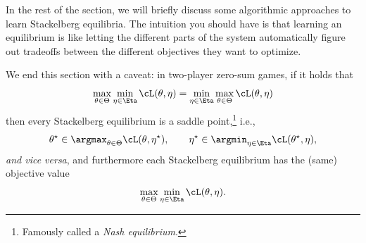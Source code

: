 \documentclass[../../book-main.tex]{subfiles}
\begin{document}
In the rest of the section, we will briefly discuss some algorithmic
approaches to learn Stackelberg equilibria. The intuition you should
have is that learning an equilibrium is like letting the different
parts of the system automatically figure out tradeoffs between the
different objectives they want to optimize.

We end this section with a caveat: in two-player zero-sum games, if
it holds that
\begin{equation}
    \max_{\theta \in \Theta}\min_{\eta \in \Eta}\cL(\theta, \eta) =
    \min_{\eta \in \Eta}\max_{\theta \in \Theta}\cL(\theta, \eta)
\end{equation}
then every Stackelberg equilibrium is a saddle
point,\footnote{Famously called a \textit{Nash equilibrium}.} i.e.,
\begin{equation}
    \theta^{\star} \in \argmax_{\theta \in \Theta}\cL(\theta,
    \eta^{\star}), \qquad \eta^{\star} \in \argmin_{\eta \in
    \Eta}\cL(\theta^{\star}, \eta),
\end{equation}
\textit{and vice versa}, and furthermore each Stackelberg equilibrium
has the (same) objective value \[\max_{\theta \in \Theta}\min_{\eta
\in \Eta}\cL(\theta, \eta).\]
\end{document}

